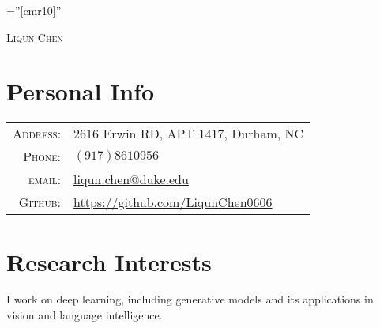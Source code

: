 \documentclass[a4paper,10pt]{article}
\begin{document}

\pagestyle{empty} %

\font\fb=''[cmr10]'' %

\par{\centering
		{\Huge \textsc{Liqun Chen}
	}\bigskip\par}

\section{Personal Info}

\begin{tabular}{rl}
    \textsc{Address:}   & $2616$ Erwin RD, APT $1417$, Durham, NC \\
    \textsc{Phone:}     & $(917)8610956$\\
    \textsc{email:}     & \href{mailto:liqun.chen@duke.edu}{liqun.chen@duke.edu}\\
    \textsc{Github:}    & \href{https://github.com/LiqunChen0606}{https://github.com/LiqunChen0606}
\end{tabular}

\section{Research Interests}
\small I work on deep learning, including generative models and its applications in vision and language intelligence.
\vspace{-3mm}
\end{document}

